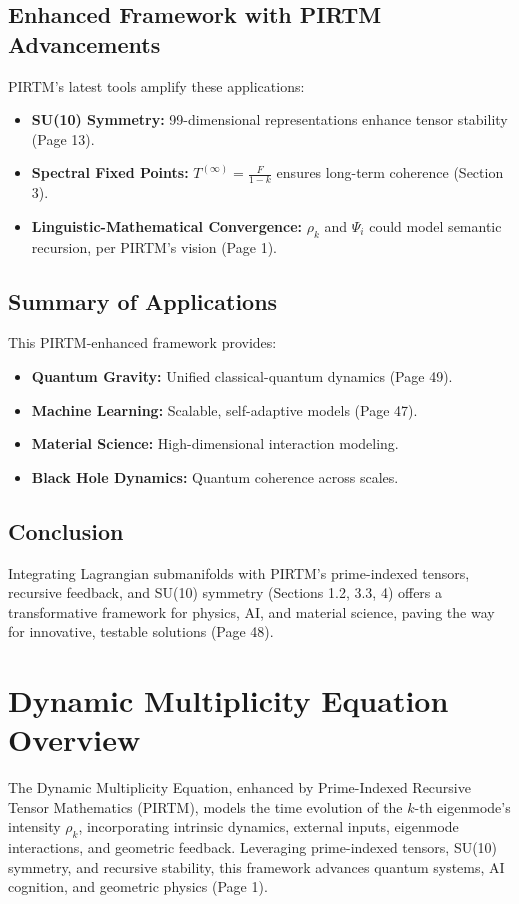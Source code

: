 \documentclass{article}
\theoremstyle{plain}
\begin{document}
\subsection{Enhanced Framework with PIRTM Advancements}
PIRTM’s latest tools amplify these applications:
\begin{itemize}
    \item \textbf{SU(10) Symmetry:} 99-dimensional representations enhance tensor stability (Page 13).
    \item \textbf{Spectral Fixed Points:} \( T^{(\infty)} = \frac{F}{1 - k} \) ensures long-term coherence (Section 3).
    \item \textbf{Linguistic-Mathematical Convergence:} \( \rho_k \) and \( \Psi_i \) could model semantic recursion, per PIRTM’s vision (Page 1).
\end{itemize}

\subsection*{Summary of Applications}
This PIRTM-enhanced framework provides:
\begin{itemize}
    \item \textbf{Quantum Gravity:} Unified classical-quantum dynamics (Page 49).
    \item \textbf{Machine Learning:} Scalable, self-adaptive models (Page 47).
    \item \textbf{Material Science:} High-dimensional interaction modeling.
    \item \textbf{Black Hole Dynamics:} Quantum coherence across scales.
\end{itemize}

\subsection{Conclusion}
Integrating Lagrangian submanifolds with PIRTM’s prime-indexed tensors, recursive feedback, and SU(10) symmetry (Sections 1.2, 3.3, 4) offers a transformative framework for physics, AI, and material science, paving the way for innovative, testable solutions (Page 48).


\section*{Dynamic Multiplicity Equation Overview}

The Dynamic Multiplicity Equation, enhanced by Prime-Indexed Recursive Tensor Mathematics (PIRTM), models the time evolution of the \( k \)-th eigenmode’s intensity \( \rho_k \), incorporating intrinsic dynamics, external inputs, eigenmode interactions, and geometric feedback. Leveraging prime-indexed tensors, SU(10) symmetry, and recursive stability, this framework advances quantum systems, AI cognition, and geometric physics (Page 1).
\end{document}
